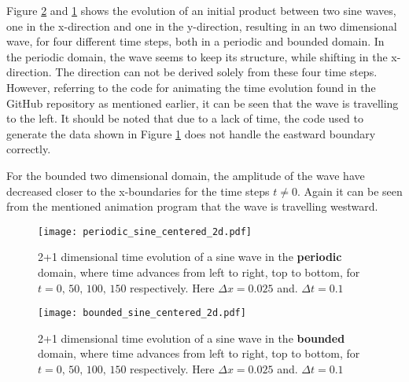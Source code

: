 Figure \ref{fig:boundedsine2d} and \ref{fig:periodicsine2d} shows the evolution of an initial product between two sine waves, one in the x-direction and one in the y-direction, resulting in an two dimensional wave, for four different time steps, both in a periodic and bounded domain. In the periodic domain, the wave seems to keep its structure, while shifting in the x-direction. The direction can not be derived solely from these four time steps. However, referring to the code for animating the time evolution found in the GitHub repository as mentioned earlier, it can be seen that the wave is travelling to the left. It should be noted that due to a lack of time, the code used to generate the data shown in Figure \ref{fig:periodicsine2d} does not handle the eastward boundary correctly. 

For the bounded two dimensional domain, the amplitude of the wave have decreased closer to the x-boundaries for the time steps $t\neq 0$. Again it can be seen from the mentioned animation program that the wave is travelling westward. 
\begin{figure}[htbp]
	\centering
	\texttt{[image: periodic\_sine\_centered\_2d.pdf]}
	\caption{2+1 dimensional time evolution of a sine wave in the \textbf{periodic} domain, where time advances from left to right, top to bottom, for $t = 0,\, 50,\, 100,\, 150$ respectively. Here $\Delta x = 0.025$ and. $\Delta t = 0.1$}
	\label{fig:periodicsine2d}
\end{figure}

\begin{figure}[htbp]
	\centering
	\texttt{[image: bounded\_sine\_centered\_2d.pdf]}
	\caption{2+1 dimensional time evolution of a sine wave in the \textbf{bounded} domain, where time advances from left to right, top to bottom, for $t = 0,\, 50,\, 100,\, 150$ respectively. Here $\Delta x = 0.025$ and. $\Delta t = 0.1$}
	\label{fig:boundedsine2d}
\end{figure}


